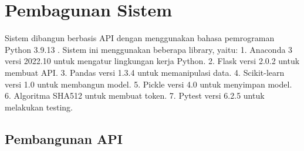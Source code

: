 \section{Pembagunan Sistem}
Sistem dibangun berbasis API dengan menggunakan bahasa pemrograman Python 3.9.13 . Sistem ini menggunakan beberapa library, yaitu:
1. Anaconda 3 versi 2022.10 untuk mengatur lingkungan kerja Python.
2. Flask versi 2.0.2 untuk membuat API.
3. Pandas versi 1.3.4 untuk memanipulasi data.
4. Scikit-learn versi 1.0 untuk membangun model.
5. Pickle versi 4.0 untuk menyimpan model.
6. Algoritma SHA512 untuk membuat token.
7. Pytest versi 6.2.5 untuk melakukan testing.

\subsection{Pembangunan API}




